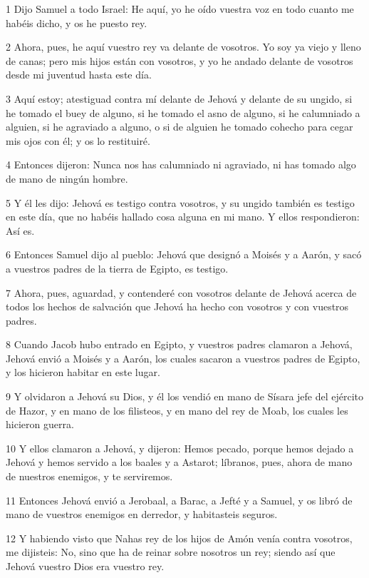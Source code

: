 \par 1 Dijo Samuel a todo Israel: He aquí, yo he oído vuestra voz en todo cuanto me habéis dicho, y os he puesto rey.
\par 2 Ahora, pues, he aquí vuestro rey va delante de vosotros. Yo soy ya viejo y lleno de canas; pero mis hijos están con vosotros, y yo he andado delante de vosotros desde mi juventud hasta este día.
\par 3 Aquí estoy; atestiguad contra mí delante de Jehová y delante de su ungido, si he tomado el buey de alguno, si he tomado el asno de alguno, si he calumniado a alguien, si he agraviado a alguno, o si de alguien he tomado cohecho para cegar mis ojos con él; y os lo restituiré.
\par 4 Entonces dijeron: Nunca nos has calumniado ni agraviado, ni has tomado algo de mano de ningún hombre.
\par 5 Y él les dijo: Jehová es testigo contra vosotros, y su ungido también es testigo en este día, que no habéis hallado cosa alguna en mi mano. Y ellos respondieron: Así es.
\par 6 Entonces Samuel dijo al pueblo: Jehová que designó a Moisés y a Aarón, y sacó a vuestros padres de la tierra de Egipto, es testigo.
\par 7 Ahora, pues, aguardad, y contenderé con vosotros delante de Jehová acerca de todos los hechos de salvación que Jehová ha hecho con vosotros y con vuestros padres.
\par 8 Cuando Jacob hubo entrado en Egipto, y vuestros padres clamaron a Jehová, Jehová envió a Moisés y a Aarón, los cuales sacaron a vuestros padres de Egipto, y los hicieron habitar en este lugar.
\par 9 Y olvidaron a Jehová su Dios, y él los vendió en mano de Sísara jefe del ejército de Hazor, y en mano de los filisteos, y en mano del rey de Moab, los cuales les hicieron guerra.
\par 10 Y ellos clamaron a Jehová, y dijeron: Hemos pecado, porque hemos dejado a Jehová y hemos servido a los baales y a Astarot; líbranos, pues, ahora de mano de nuestros enemigos, y te serviremos. 
\par 11 Entonces Jehová envió a Jerobaal, a Barac, a Jefté y a Samuel, y os libró de mano de vuestros enemigos en derredor, y habitasteis seguros.
\par 12 Y habiendo visto que Nahas rey de los hijos de Amón venía contra vosotros, me dijisteis: No, sino que ha de reinar sobre nosotros un rey; siendo así que Jehová vuestro Dios era vuestro rey.

